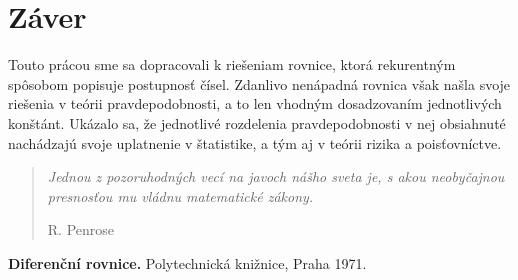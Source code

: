 \documentclass[a4paper,10pt]{article}
\theoremstyle{plain}
\theoremstyle{definition}
\begin{document}
\section{Záver}
\hfill{Touto  prácou sme sa dopracovali k riešeniam rovnice, ktorá rekurentným\\ spôsobom popisuje postupnosť čísel. Zdanlivo nenápadná rovnica však našla svoje riešenia v teórii pravdepodobnosti, a to len vhodným dosadzovaním jednotlivých konštánt. Ukázalo sa, že jednotlivé rozdelenia pravdepodobnosti v nej obsiahnuté nachádzajú svoje uplatnenie v štatistike, a tým aj v teórii rizika a poisťovníctve.}

\begin{quote}
\textit{Jednou z pozoruhodných vecí na javoch nášho sveta je, s akou neobyčajnou presnosťou mu vládnu matematické zákony.}

\hfill R. Penrose 

\end{quote}

\begin{thebibliography}{9}
               {\bf Diferenční rovnice.}
           Polytechnická knižnice, Praha 1971.
\end{thebibliography}
\end{document}
